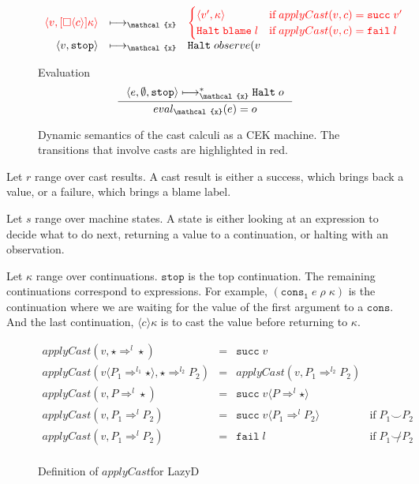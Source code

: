 \documentclass[acmsmall,review,anonymous]{acmart}\settopmatter{printfolios=true,printccs=false,printacmref=false}
\newcommand{\funrule}[3]{#1 &=& #2 & #3\\}
\newcommand{\lazyD}{Lazy\;D}
\newcommand{\sOOinspect}[3]{\langle#1,#2,#3\rangle}
\newcommand{\sOOreturn}[2]{\langle#1,#2\rangle}
\newcommand{\sOOhalt}[1]{\mathtt{Halt} \; #1}
\newcommand{\cOOcast}[3]{#1 \Rightarrow^{#2} #3}
\newcommand{\oOOblame}[1]{\mathtt{blame} \; #1}
\newcommand{\vOOcast}[2]{#1\langle#2\rangle}
\newcommand{\rOOsucc}[1]{\mathtt{succ}\;#1}
\newcommand{\rOOfail}[1]{\mathtt{fail}\;#1}
\newcommand{\kOOmt}[0]{\mathtt{stop}}
\newcommand{\kOOcast}[2]{
  [\square \langle #1 \rangle]#2}
\newcommand{\hckOOmt}[0]{\mathtt{stop}}
\newcommand{\sidecond}[1]{\text{if}\;#1}
\newcommand{\judgeCreduceTrans}[2]{#1 \longmapsto_{\mathcal{x}}^{*} #2}
\newcommand{\judgeCeval}[2]{eval_{\mathcal{x}}(#1) = #2}
\newcommand{\redrule}[3]{#1 & \longmapsto_\mathcal{x} & #2 & #3\\}
\newcommand{\highlight}[1]{{\color{red} #1}}
\begin{document}
\begin{figure}
\[\begin{array}{rclr}
  \redrule{
    \highlight{\sOOreturn{v}{
        \kOOcast{c}{\kappa}
      }}
  }{
\highlight{          
\begin{cases}
  \sOOreturn{v'}{\kappa} & \sidecond{applyCast(v,c) = \rOOsucc{v'}}
  \\
  \sOOhalt{\oOOblame{l}} & \sidecond{applyCast(v,c) = \rOOfail{l}}
\end{cases}}
  }{}
\redrule{
\sOOreturn{v}{\kOOmt}}{
\sOOhalt{observe(v}}{}
  \end{array}
  \]  
  
  Evaluation \fbox{$\judgeCeval{e}{o}$}
  \[
  \inference{
    \judgeCreduceTrans{
      \sOOinspect{e}{\emptyset}{\hckOOmt}
    }{\sOOhalt{o}}    
  }{
    \judgeCeval{e}{o}
  }
  \]
  
  \caption{Dynamic semantics of the cast calculi as a CEK
          machine. The transitions that involve casts are highlighted
          in red.}
  \label{fig:machine-cekc}
\end{figure}

Let $r$ range over cast results. A cast result is either a success, which 
brings back a value, or a failure, which brings a blame label.

Let $s$ range over machine states. A state is either looking at an 
expression to decide what to do next, returning a value to a continuation, or 
halting with an observation.

Let $\kappa$ range over continuations. $\mathtt{stop}$ is the top 
continuation. The remaining continuations correspond to expressions. For 
example, $(\mathtt{cons_1} \; e \; \rho \; \kappa)$ is the continuation where 
we are waiting for the value of the first argument to a $\mathtt{cons}$. And 
the last continuation, $\langle c \rangle \kappa$ is to cast the value before 
returning to $\kappa$.

\begin{figure}
  
  \[
  \begin{array}{rclr}
  \funrule{
    applyCast(v,\cOOcast{\star}{l}{\star})
  }{
    \rOOsucc{v}
  }{}
  \funrule{
    applyCast(\vOOcast{v}{\cOOcast{P_1}{l_1}{\star}},\cOOcast{\star}{l_2}{P_2})
  }{
    applyCast(v,\cOOcast{P_1}{l_2}{P_2})
  }{}
  \funrule{
    applyCast(v,\cOOcast{P}{l}{\star})
  }{
    \rOOsucc{\vOOcast{v}{\cOOcast{P}{l}{\star}}}
  }{}
  \funrule{
    applyCast(v,\cOOcast{P_1}{l}{P_2})
  }{
    \rOOsucc{\vOOcast{v}{\cOOcast{P_1}{l}{P_2}}}
  }{\sidecond{P_1 \smile P_2}}
  \funrule{
    applyCast(v,\cOOcast{P_1}{l}{P_2})
  }{
    \rOOfail{l}
  }{\sidecond{P_1 \not\smile P_2}}
  
  \end{array}
  \]
  \caption{Definition of $applyCast$for \lazyD}
  \label{fig:applyCast-D-C}
\end{figure}
\end{document}
